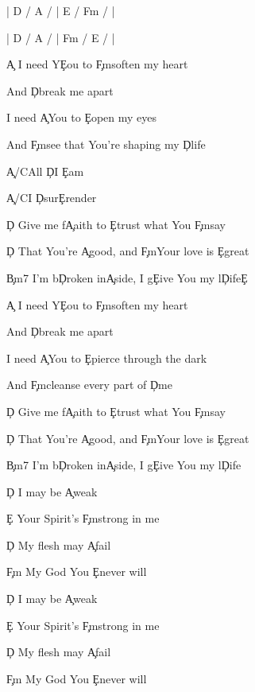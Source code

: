 \documentclass[9pt]{extarticle}
\begin{document}
\bsong

\bi
|  D / A /  |  E / F\s m /  |

|  D / A /  |  F\s m / E /  |
\ei

\bv
\c{A} I need Y\c{E}ou to \c{F\s m}soften my heart

And \c{D}break me apart

I need \c{A}You to \c{E}open my eyes

And \c{F\s m}see that You're shaping my \c{D}life
\ev

\bp
\c{A/C\s }All \c{D}I \c{E}am

\c{A/C\s }I \c{D}sur\c{E}render
\ep

\bc
\c{D} Give me f\c{A}aith to \c{E}trust what You \c{F\s m}say

\c{D} That You're \c{A}good, and \c{F\s m}Your love is \c{E}great

\c{Bm7} I'm b\c{D}roken in\c{A}side, I g\c{E}ive You my l\c{D}ife\c{E}
\ec

\bv
\c{A} I need Y\c{E}ou to \c{F\s m}soften my heart

And \c{D}break me apart

I need \c{A}You to \c{E}pierce through the dark

And \c{F\s m}cleanse every part of \c{D}me
\ev


\bc
\c{D} Give me f\c{A}aith to \c{E}trust what You \c{F\s m}say

\c{D} That You're \c{A}good, and \c{F\s m}Your love is \c{E}great

\c{Bm7} I'm b\c{D}roken in\c{A}side, I g\c{E}ive You my l\c{D}ife
\ec

\bb
\c{D} I may be \c{A}weak

\c{E} Your Spirit's \c{F\s m}strong in me

\c{D} My flesh may \c{A}fail

\c{F\s m} My God You \c{E}never will

\c{D} I may be \c{A}weak

\c{E} Your Spirit's \c{F\s m}strong in me

\c{D} My flesh may \c{A}fail

\c{F\s m} My God You \c{E}never will
\eb




\esong
\end{document}
